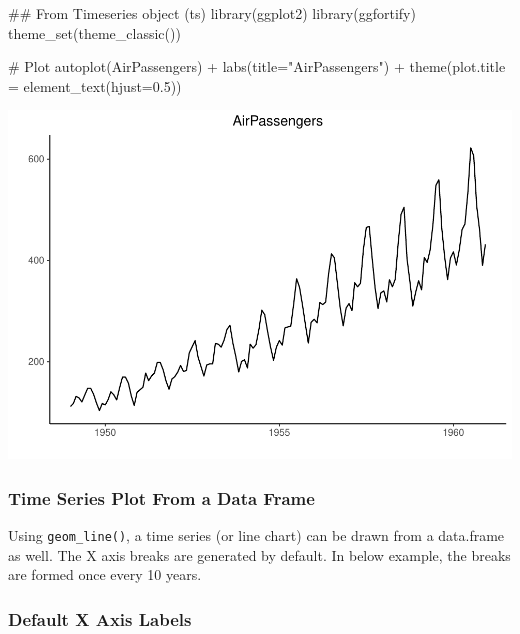 \documentclass[a4paper]{article}
\newenvironment{Shaded}{}{}
\newcommand{\KeywordTok}[1]{\textcolor[rgb]{0.00,0.00,1.00}{#1}}
\newcommand{\DataTypeTok}[1]{#1}
\newcommand{\FloatTok}[1]{#1}
\newcommand{\StringTok}[1]{\textcolor[rgb]{0.00,0.50,0.50}{#1}}
\newcommand{\CommentTok}[1]{\textcolor[rgb]{0.00,0.50,0.00}{#1}}
\newcommand{\OperatorTok}[1]{#1}
\newcommand{\NormalTok}[1]{#1}
\begin{document}
\begin{Shaded}
\begin{Highlighting}[]
\NormalTok{## From Timeseries object (ts)}
\KeywordTok{library}\NormalTok{(ggplot2)}
\KeywordTok{library}\NormalTok{(ggfortify)}
\KeywordTok{theme_set}\NormalTok{(}\KeywordTok{theme_classic}\NormalTok{())}

\CommentTok{# Plot }
\KeywordTok{autoplot}\NormalTok{(AirPassengers) }\OperatorTok{+}\StringTok{ }
\StringTok{  }\KeywordTok{labs}\NormalTok{(}\DataTypeTok{title=}\StringTok{"AirPassengers"}\NormalTok{) }\OperatorTok{+}\StringTok{ }
\StringTok{  }\KeywordTok{theme}\NormalTok{(}\DataTypeTok{plot.title =} \KeywordTok{element_text}\NormalTok{(}\DataTypeTok{hjust=}\FloatTok{0.5}\NormalTok{))}
\end{Highlighting}
\end{Shaded}

\includegraphics{M24-ggplot2_Gallery_files/figure-latex/unnamed-chunk-41-1.pdf}

\newpage

\subsubsection{Time Series Plot From a Data
Frame}\label{time-series-plot-from-a-data-frame}

Using \texttt{geom\_line()}, a time series (or line chart) can be drawn
from a data.frame as well. The X axis breaks are generated by default.
In below example, the breaks are formed once every 10 years.

\subsubsection{Default X Axis Labels}\label{default-x-axis-labels}
\end{document}
